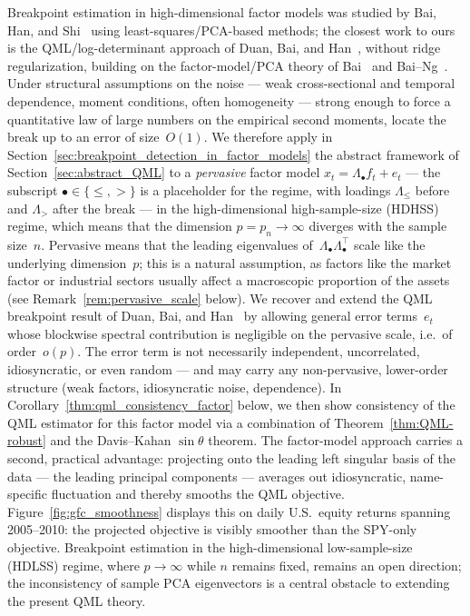\documentclass[10pt, letterpaper]{amsart}
\begin{document}
Breakpoint estimation in high-dimensional factor models was studied by Bai, Han, and Shi~\cite{BaiHanShi2020} using least-squares/PCA-based methods; the closest work to ours is the QML/log-determinant approach of Duan, Bai, and Han~\cite{DuanBaiHan2023}, without ridge regularization, building on the factor-model/PCA theory of Bai~\cite{Bai2003} and Bai--Ng~\cite{BaiNg2002}. Under structural assumptions on the noise --- weak cross-sectional and temporal dependence, moment conditions, often homogeneity --- strong enough to force a quantitative law of large numbers on the empirical second moments, \cite{DuanBaiHan2023} locate the break up to an error of size~$O(1)$.
We therefore apply in Section~\ref{sec:breakpoint_detection_in_factor_models} the abstract framework of Section~\ref{sec:abstract_QML} to a \emph{pervasive} factor model $x_t=\Lambda_\bullet f_t+e_t$ --- the subscript $\bullet\in\{\leq,>\}$ is a placeholder for the regime, with loadings $\Lambda_\leq$ before and $\Lambda_>$ after the break --- in the high-dimensional high-sample-size (HDHSS) regime, which means that the dimension $p=p_n\to\infty$ diverges with the sample size~$n$. Pervasive means that the leading
eigenvalues of~$\Lambda_\bullet \Lambda_\bullet^{\top}$ scale like the underlying dimension~$p$; this is a natural assumption, as factors like the market factor or industrial sectors usually affect a macroscopic proportion of the assets (see Remark~\ref{rem:pervasive_scale} below). We recover and extend the QML breakpoint result of Duan, Bai, and Han~\cite{DuanBaiHan2023} by allowing general error terms~$e_t$ whose blockwise spectral contribution is negligible on the pervasive scale, i.e.~of order~$o(p)$. The error term is not necessarily independent, uncorrelated, idiosyncratic, or even random --- and may carry any non-pervasive, lower-order structure (weak factors, idiosyncratic noise, dependence). In Corollary~\ref{thm:qml_consistency_factor} below, we then show consistency of the QML estimator for this factor model via a combination of Theorem~\ref{thm:QML-robust} and the Davis--Kahan $\sin\theta$ theorem. The factor-model approach carries a second, practical advantage: projecting onto the leading left singular basis of the data --- the leading principal components --- averages out idiosyncratic, name-specific fluctuation and thereby smooths the QML objective. Figure~\ref{fig:gfc_smoothness} displays this on daily U.S.~equity returns spanning 2005--2010: the projected objective is visibly smoother than the SPY-only objective.
Breakpoint estimation in the high-dimensional low-sample-size (HDLSS) regime, where $p\to\infty$ while $n$ remains fixed, remains an open direction; the inconsistency of sample PCA eigenvectors is a central obstacle to extending the present QML theory.\\
\end{document}
